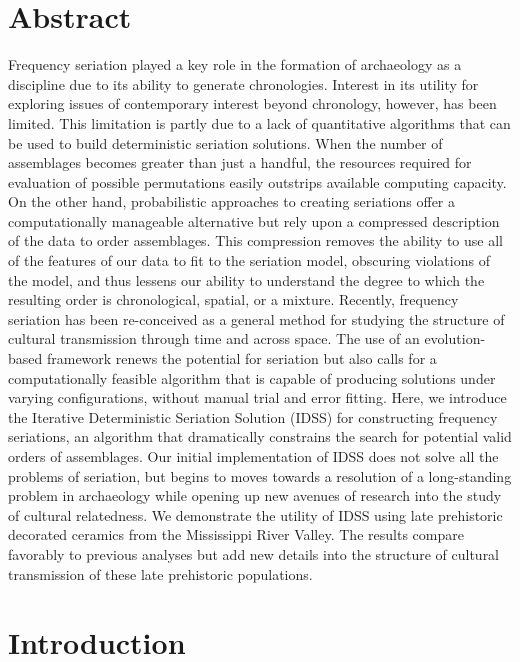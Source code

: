 \documentclass[10pt,letterpaper]{article}
\begin{document}
\section*{Abstract}
Frequency seriation played a key role in the formation of archaeology as a discipline due to its ability to generate chronologies. Interest in its utility for exploring issues of contemporary interest beyond chronology, however, has been limited. This limitation is partly due to a lack of quantitative algorithms that can be used to build deterministic seriation solutions. When the number of assemblages becomes greater than just a handful, the resources required for evaluation of possible permutations easily outstrips available computing capacity. On the other hand, probabilistic approaches to creating seriations offer a computationally manageable alternative but rely upon a compressed description of the data to order assemblages. This compression removes the ability to use all of the features of our data to fit to the seriation model, obscuring violations of the model, and thus lessens our ability to understand the degree to which the resulting order is chronological, spatial, or a mixture. Recently, frequency seriation has been re-conceived as a general method for studying the structure of cultural transmission through time and across space. The use of an evolution-based framework renews the potential for seriation but also calls for a computationally feasible algorithm that is capable of producing solutions under varying configurations, without manual trial and error fitting. Here, we introduce the Iterative Deterministic Seriation Solution (IDSS) for constructing frequency seriations, an algorithm that dramatically constrains the search for potential valid orders of assemblages. Our initial implementation of IDSS does not solve all the problems of seriation, but begins to moves towards a resolution of a long-standing problem in archaeology while opening up new avenues of research into the study of cultural relatedness. We demonstrate the utility of IDSS using late prehistoric decorated ceramics from the Mississippi River Valley. The results compare favorably to previous analyses but add new details into the structure of cultural transmission of these late prehistoric populations.


\linenumbers

\section*{Introduction}
\end{document}
